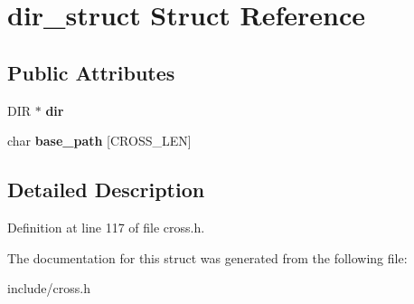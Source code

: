 \hypertarget{structdir__struct}{\section{dir\-\_\-struct Struct Reference}
\label{structdir__struct}
}
\subsection*{Public Attributes}
\begin{DoxyCompactItemize}
\item 
\hypertarget{structdir__struct_a972565488eed4eb755a2b2604e2fa9c5}{D\-I\-R $\ast$ {\bfseries dir}}\label{structdir__struct_a972565488eed4eb755a2b2604e2fa9c5}

\item 
\hypertarget{structdir__struct_a9cb3bc0a6f7312b318b93c25602ef196}{char {\bfseries base\-\_\-path} \mbox{[}C\-R\-O\-S\-S\-\_\-\-L\-E\-N\mbox{]}}\label{structdir__struct_a9cb3bc0a6f7312b318b93c25602ef196}

\end{DoxyCompactItemize}


\subsection{Detailed Description}


Definition at line 117 of file cross.\-h.



The documentation for this struct was generated from the following file\-:\begin{DoxyCompactItemize}
\item 
include/cross.\-h\end{DoxyCompactItemize}
